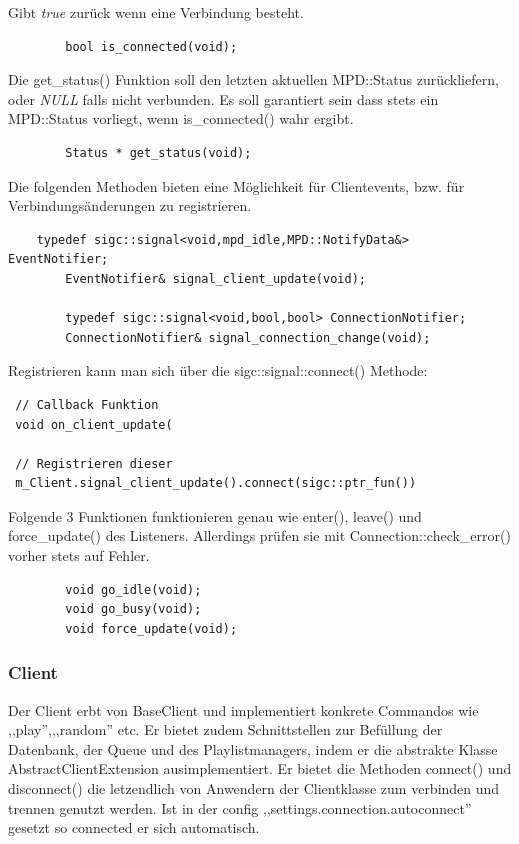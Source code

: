 Gibt \textit{true} zurück wenn eine Verbindung besteht.
\begin{verbatim}
        bool is_connected(void);
\end{verbatim}

Die get\_status() Funktion soll den letzten aktuellen MPD::Status zurückliefern,
oder \emph{NULL} falls nicht verbunden. Es soll garantiert sein dass stets ein MPD::Status vorliegt,
wenn is\_connected() wahr ergibt.
\begin{verbatim}        
        Status * get_status(void);
\end{verbatim}

Die folgenden Methoden bieten eine Möglichkeit für Clientevents, bzw. für Verbindungsänderungen zu registrieren.
\begin{verbatim}
	typedef sigc::signal<void,mpd_idle,MPD::NotifyData&> EventNotifier;
        EventNotifier& signal_client_update(void);
        
        typedef sigc::signal<void,bool,bool> ConnectionNotifier;
        ConnectionNotifier& signal_connection_change(void);
\end{verbatim}

Registrieren kann man sich über die sigc::signal::connect() Methode:
\begin{verbatim}
 // Callback Funktion
 void on_client_update(

 // Registrieren dieser
 m_Client.signal_client_update().connect(sigc::ptr_fun())
\end{verbatim}

Folgende 3 Funktionen funktionieren genau wie enter(), leave() und force\_update() des Listeners.
Allerdings prüfen sie mit Connection::check\_error() vorher stets auf Fehler.
\begin{verbatim}
        void go_idle(void);
        void go_busy(void);
        void force_update(void);
\end{verbatim}

\subsubsection{Client}
Der Client erbt von BaseClient und implementiert konkrete Commandos wie ,,play'',,,random'' etc.
Er bietet zudem Schnittstellen zur Befüllung der Datenbank, der Queue und des Playlistmanagers, indem 
er die abstrakte Klasse AbstractClientExtension ausimplementiert.
Er bietet die Methoden connect() und disconnect() die letzendlich von Anwendern der Clientklasse zum verbinden und trennen genutzt werden. 
Ist in der config ,,settings.connection.autoconnect'' gesetzt so connected er sich automatisch.


